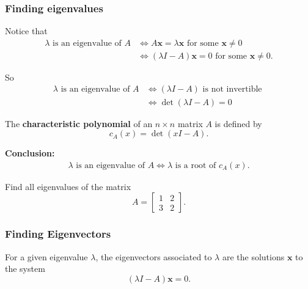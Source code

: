 \documentclass[20pt,a4paper]{extarticle}
\newcounter{example}
\newcounter{definition}
\begin{document}
\bigskip 

\subsubsection{Finding eigenvalues}

Notice that
\begin{align*}
	\lambda \text{ is an eigenvalue of } A &\iff A\mathbf{x} = \lambda \mathbf{x} \text{ for some } \mathbf{x} \neq 0 \\
	& \iff (\lambda I - A) \mathbf{x} = 0 \text{ for some } \mathbf{x} \neq 0 .
\end{align*}

So
	\begin{align*}
		\lambda \text{ is an eigenvalue of } A &\iff (\lambda I - A) \text{ is not invertible } \\ 
		&\iff \det (\lambda I - A) = 0 
	\end{align*}

\begin{definition}
The \textbf{characteristic polynomial} of an $n \times n$ matrix $A$ is defined by
	\[
		c_A (x) = \det (xI - A) .
	\]
\end{definition}

\textbf{Conclusion:}
\begin{align*}
		\lambda \text{ is an eigenvalue of } A \iff \lambda \text{ is a root of } c_A (x) .
	\end{align*}

\newpage 

\begin{example}
Find all eigenvalues of the matrix 
	\[
		A = \begin{bmatrix}
		1 & 2 \\ 3 & 2 
		\end{bmatrix} .
	\]
\end{example}

\begin{solution}

\end{solution}

\newpage 

\phantom{2}

\newpage 

\subsubsection{Finding Eigenvectors}

For a given eigenvalue $\lambda$, the eigenvectors associated to $\lambda$ are the solutions $\mathbf{x}$ to the system
	\[
		(\lambda I - A) \mathbf{x} = 0 .
	\]
\end{document}
